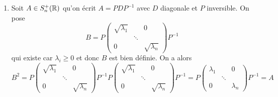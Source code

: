 {\begin{td-sol}
\begin{enumerate}[label=(\alph*)]
            \item Soit \(A\in S_n^+(\mathbb{R})\) qu'on écrit \(A = PDP^{-1}\) avec \(D\) diagonale et \(P\) inversible.
            On pose
            \begin{equation*}
                B = P \begin{pmatrix}
                    \sqrt{\lambda_1} & & 0\\
                    & \ddots & \\
                    0 & & \sqrt{\lambda_n}
                \end{pmatrix} P^{-1}
            \end{equation*}
            qui existe car \(\lambda_i\geq 0\) et donc \(B\) est bien définie. On a alors
            \begin{equation*}
                B^2 = P \begin{pmatrix}
                    \sqrt{\lambda_1} & & 0\\
                    & \ddots & \\
                    0 & & \sqrt{\lambda_n}
                \end{pmatrix} P^{-1} P \begin{pmatrix}
                    \sqrt{\lambda_1} & & 0\\
                    & \ddots & \\
                    0 & & \sqrt{\lambda_n}
                \end{pmatrix} P^{-1} = P \begin{pmatrix}
                    \lambda_1 & & 0\\
                    & \ddots & \\
                    0 & & \lambda_n
                \end{pmatrix} P^{-1} = A
            \end{equation*}
        \end{enumerate}
    \end{td-sol}
}{}

